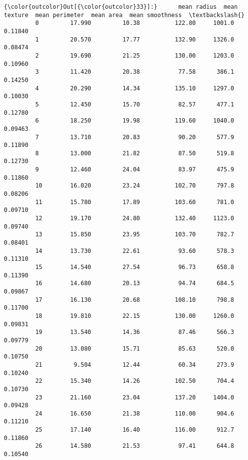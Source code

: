 \documentclass[11pt]{article}
\begin{document}
\begin{Verbatim}[commandchars=\\\{\}]
{\color{outcolor}Out[{\color{outcolor}33}]:}      mean radius  mean texture  mean perimeter  mean area  mean smoothness  \textbackslash{}
         0         17.990         10.38          122.80     1001.0          0.11840   
         1         20.570         17.77          132.90     1326.0          0.08474   
         2         19.690         21.25          130.00     1203.0          0.10960   
         3         11.420         20.38           77.58      386.1          0.14250   
         4         20.290         14.34          135.10     1297.0          0.10030   
         5         12.450         15.70           82.57      477.1          0.12780   
         6         18.250         19.98          119.60     1040.0          0.09463   
         7         13.710         20.83           90.20      577.9          0.11890   
         8         13.000         21.82           87.50      519.8          0.12730   
         9         12.460         24.04           83.97      475.9          0.11860   
         10        16.020         23.24          102.70      797.8          0.08206   
         11        15.780         17.89          103.60      781.0          0.09710   
         12        19.170         24.80          132.40     1123.0          0.09740   
         13        15.850         23.95          103.70      782.7          0.08401   
         14        13.730         22.61           93.60      578.3          0.11310   
         15        14.540         27.54           96.73      658.8          0.11390   
         16        14.680         20.13           94.74      684.5          0.09867   
         17        16.130         20.68          108.10      798.8          0.11700   
         18        19.810         22.15          130.00     1260.0          0.09831   
         19        13.540         14.36           87.46      566.3          0.09779   
         20        13.080         15.71           85.63      520.0          0.10750   
         21         9.504         12.44           60.34      273.9          0.10240   
         22        15.340         14.26          102.50      704.4          0.10730   
         23        21.160         23.04          137.20     1404.0          0.09428   
         24        16.650         21.38          110.00      904.6          0.11210   
         25        17.140         16.40          116.00      912.7          0.11860   
         26        14.580         21.53           97.41      644.8          0.10540   

\end{Verbatim}
\end{document}
